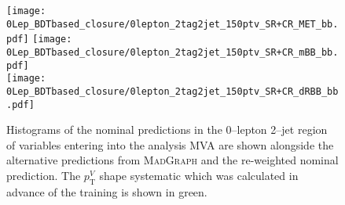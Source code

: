 \begin{figure}[ht]
  \centering
  \texttt{[image: 0Lep\_BDTbased\_closure/0lepton\_2tag2jet\_150ptv\_SR+CR\_MET\_bb.pdf]}
  \texttt{[image: 0Lep\_BDTbased\_closure/0lepton\_2tag2jet\_150ptv\_SR+CR\_mBB\_bb.pdf]}  \\
  \texttt{[image: 0Lep\_BDTbased\_closure/0lepton\_2tag2jet\_150ptv\_SR+CR\_dRBB\_bb.pdf]}
  \caption[Nominal, alternative and re-weighted nominal predictions of $W+$jets
  events (0--lepton channel, 2--jet category, MVA input variables).] {Histograms
    of the nominal predictions in the 0--lepton 2--jet region of variables
    entering into the analysis MVA are shown alongside the alternative
    predictions from \textsc{MadGraph} and the re-weighted nominal prediction.
    The $p_{\mathrm{T}}^V$ shape systematic which was calculated in advance of
    the training is shown in green.}
    \label{fig:wjets_0lep_2jet_BDTrClosure_1}
\end{figure}